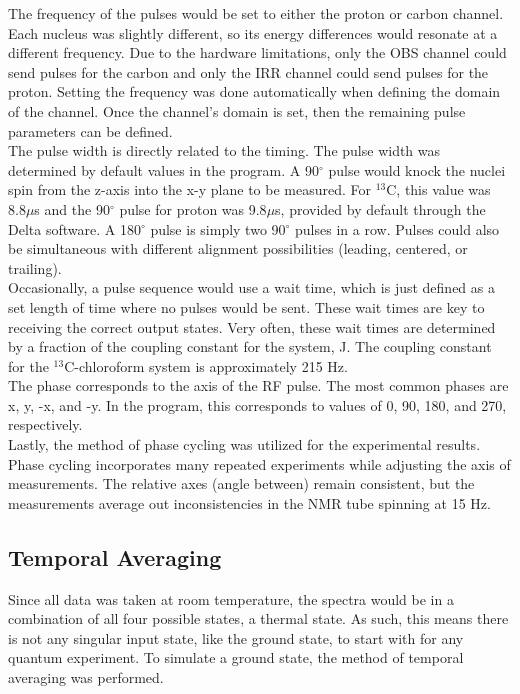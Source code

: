 \documentclass[11pt]{article}
\newcommand{\super}[1]{\ensuremath{^{\textrm{#1}}}}
\begin{document}
\begin{multicols}{2}
The frequency of the pulses would be set to either the proton or carbon channel. Each nucleus was slightly different, so its energy differences would resonate at a different frequency. Due to the hardware limitations, only the OBS channel could send pulses for the carbon and only the IRR channel could send pulses for the proton. Setting the frequency was done automatically when defining the domain of the channel. Once the channel's domain is set, then the remaining pulse parameters can be defined. \\

The pulse width is directly related to the timing. The pulse width was determined by default values in the program. A 90\super{$\circ$} pulse would knock the nuclei spin from the z-axis into the x-y plane to be measured. For \super{13}C, this value was 8.8$\mu$s and the 90\super{$\circ$} pulse for proton was 9.8$\mu$s, provided by default through the Delta software. A 180\super{$\circ$} pulse is simply two 90\super{$\circ$} pulses in a row. Pulses could also be simultaneous with different alignment possibilities (leading, centered, or trailing). \\

Occasionally, a pulse sequence would use a wait time, which is just defined as a set length of time where no pulses would be sent. These wait times are key to receiving the correct output states. Very often, these wait times are determined by a fraction of the coupling constant for the system, J. The coupling constant for the \super{13}C-chloroform system is approximately 215 Hz.\\

The phase corresponds to the axis of the RF pulse. The most common phases are x, y, -x, and -y. In the program, this corresponds to values of 0, 90, 180, and 270, respectively. \\

Lastly, the method of phase cycling was utilized for the experimental results. Phase cycling incorporates many repeated experiments while adjusting the axis of measurements. The relative axes (angle between) remain consistent, but the measurements average out inconsistencies in the NMR tube spinning at 15 Hz.

  \subsection{Temporal Averaging}
  Since all data was taken at room temperature, the spectra would be in a combination of all four possible states, a thermal state. As such, this means there is not any singular input state, like the ground state, to start with for any quantum experiment. To simulate a ground state, the method of temporal averaging was performed. \\


\end{multicols}
\end{document}

